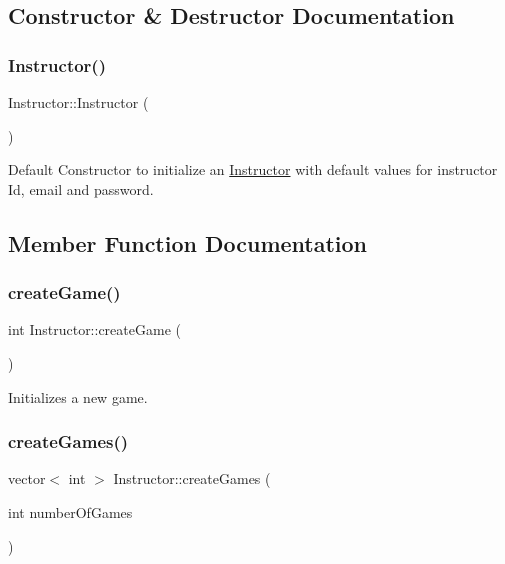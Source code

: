 \subsection{Constructor \& Destructor Documentation}
\mbox{\label{classInstructor_a7e4414cdb058703970bbcecf3a97046e}} 
\subsubsection{\texorpdfstring{Instructor()}{Instructor()}}
{\footnotesize\ttfamily Instructor\+::\+Instructor (\begin{DoxyParamCaption}{ }\end{DoxyParamCaption})}

Default Constructor to initialize an \hyperlink{classInstructor}{Instructor} with default values for instructor Id, email and password. 

\subsection{Member Function Documentation}
\mbox{\label{classInstructor_a9fca4b1272f062d14ffb5bb89b10b6f8}} 
\subsubsection{\texorpdfstring{create\+Game()}{createGame()}}
{\footnotesize\ttfamily int Instructor\+::create\+Game (\begin{DoxyParamCaption}{ }\end{DoxyParamCaption})}

Initializes a new game. \mbox{\label{classInstructor_ab8aebf063f59482476c763eb635b9936}} 
\subsubsection{\texorpdfstring{create\+Games()}{createGames()}}
{\footnotesize\ttfamily vector$<$ int $>$ Instructor\+::create\+Games (\begin{DoxyParamCaption}\item[{int}]{number\+Of\+Games }\end{DoxyParamCaption})}

